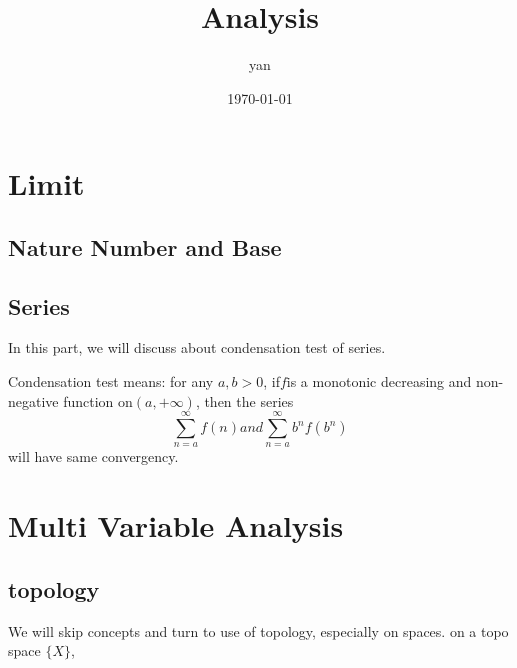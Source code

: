 \documentclass{book}
\title{Analysis}
\author{yan}
\date{\today}
\begin{document}
\frontmatter
\maketitle
\tableofcontents

\mainmatter
\part{Limit}
\chapter{Nature Number and Base}
\chapter{Series}

In this part, we will discuss about condensation test of series.

Condensation test means: for any $a, b > 0$, if$f$is a monotonic decreasing and non-negative function on$(a,+\infty)$, then the series
\begin{equation}
\sum_{n=a}^{\infty} f(n) and \sum_{n=a}^{\infty} b^nf(b^n)
\end{equation}
will have same convergency.

\part{Multi Variable Analysis}
\chapter{topology}
We will skip concepts and turn to use of topology, especially on spaces.
on a topo space $\{X\}$,
\end{document}
